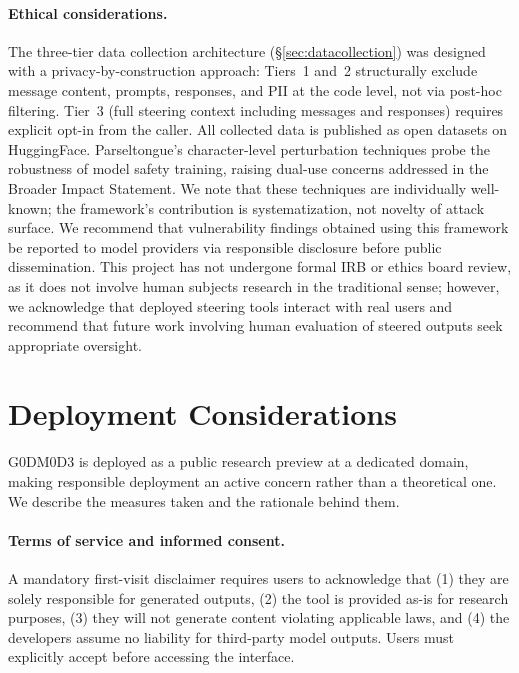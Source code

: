 \documentclass[11pt]{article}
\begin{document}
\paragraph{Ethical considerations.}
The three-tier data collection architecture (\S\ref{sec:datacollection}) was designed with a privacy-by-construction approach: Tiers~1 and~2 structurally exclude message content, prompts, responses, and PII at the code level, not via post-hoc filtering. Tier~3 (full steering context including messages and responses) requires explicit opt-in from the caller. All collected data is published as open datasets on HuggingFace.
Parseltongue's character-level perturbation techniques probe the robustness of model safety training, raising dual-use concerns addressed in the Broader Impact Statement. We note that these techniques are individually well-known; the framework's contribution is systematization, not novelty of attack surface.
We recommend that vulnerability findings obtained using this framework be reported to model providers via responsible disclosure before public dissemination. This project has not undergone formal IRB or ethics board review, as it does not involve human subjects research in the traditional sense; however, we acknowledge that deployed steering tools interact with real users and recommend that future work involving human evaluation of steered outputs seek appropriate oversight.

\section{Deployment Considerations}
\label{sec:deployment}

G0DM0D3 is deployed as a public research preview at a dedicated domain, making responsible deployment an active concern rather than a theoretical one. We describe the measures taken and the rationale behind them.

\paragraph{Terms of service and informed consent.} A mandatory first-visit disclaimer requires users to acknowledge that (1) they are solely responsible for generated outputs, (2) the tool is provided as-is for research purposes, (3) they will not generate content violating applicable laws, and (4) the developers assume no liability for third-party model outputs. Users must explicitly accept before accessing the interface.
\end{document}
